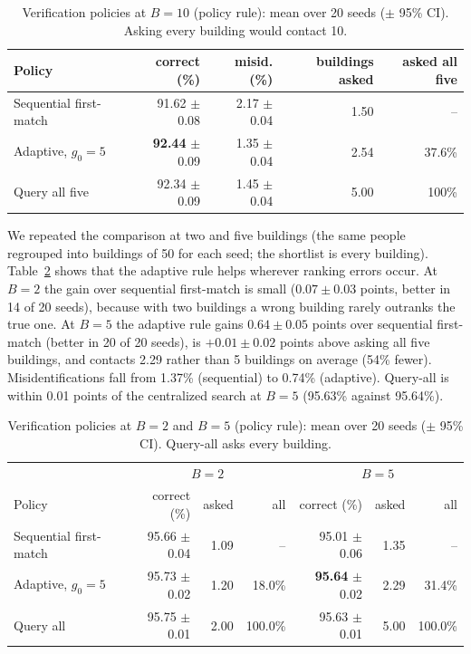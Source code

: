 \documentclass[runningheads]{llncs}
\begin{document}
\begin{table}[htbp]
\caption{Verification policies at $B=10$ (policy rule): mean over 20 seeds ($\pm$ 95\% CI). Asking every building would
contact 10.}
\label{tab:adaptive}
\small
\setlength{\tabcolsep}{3.5pt}
\renewcommand{\arraystretch}{1.25}
\begin{tabular}{|l|r|r|r|r|}
\hline
Policy & correct (\%) & misid. (\%) & buildings asked & asked all five \\
\hline
Sequential first-match & 91.62 $\pm$ 0.08 & 2.17 $\pm$ 0.04 & 1.50 & -- \\
Adaptive, $g_0=5$ & \textbf{92.44} $\pm$ 0.09 & 1.35 $\pm$ 0.04 & 2.54 & 37.6\% \\
Query all five & 92.34 $\pm$ 0.09 & 1.45 $\pm$ 0.04 & 5.00 & 100\% \\
\hline
\end{tabular}
\end{table}

We repeated the comparison at two and five buildings (the same people regrouped into buildings of 50 for each seed;
the shortlist is every building). Table~\ref{tab:small} shows that the adaptive rule helps wherever ranking errors
occur. At $B=2$ the gain over sequential first-match is small ($0.07\pm0.03$ points, better in 14 of 20 seeds), because with two buildings a wrong building rarely outranks the true one. At $B=5$ the adaptive rule gains $0.64\pm0.05$ points over sequential first-match (better in 20 of 20 seeds), is $+0.01\pm0.02$ points above asking all five buildings, and contacts 2.29 rather than 5 buildings on average (54\% fewer). Misidentifications fall from 1.37\% (sequential) to 0.74\% (adaptive). Query-all is within 0.01 points of the centralized search at $B=5$ (95.63\% against 95.64\%).

\begin{table}[htbp]
\caption{Verification policies at $B=2$ and $B=5$ (policy rule): mean over 20 seeds ($\pm$ 95\% CI). Query-all asks
every building.}
\label{tab:small}
\small
\setlength{\tabcolsep}{3.5pt}
\renewcommand{\arraystretch}{1.25}
\begin{tabular}{|l|r|r|r|r|r|r|}
\hline
 & \multicolumn{3}{c|}{$B=2$} & \multicolumn{3}{c|}{$B=5$} \\
Policy & correct (\%) & asked & all & correct (\%) & asked & all \\
\hline
Sequential first-match & 95.66 $\pm$ 0.04 & 1.09 & -- & 95.01 $\pm$ 0.06 & 1.35 & -- \\
Adaptive, $g_0=5$ & 95.73 $\pm$ 0.02 & 1.20 & 18.0\% & \textbf{95.64}  $\pm$ 0.02 & 2.29 & 31.4\% \\
Query all & 95.75 $\pm$ 0.01 & 2.00 & 100.0\% & 95.63 $\pm$ 0.01 & 5.00 & 100.0\% \\
\hline
\end{tabular}
\end{table}
\end{document}
